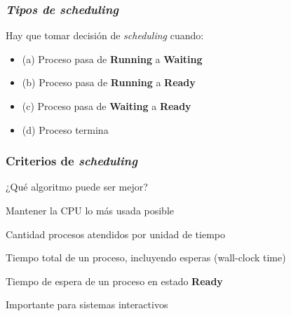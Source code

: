 \documentclass[letter]{beamer}
\begin{document}
\begin{frame}
  \frametitle{{\em Tipos de {\em scheduling}}}

  Hay que tomar decisión de {\em scheduling} cuando:
  \begin{itemize}
    \item<2->(a) Proceso pasa de {\bf Running} a {\bf Waiting}
    \item<2->(b) Proceso pasa de {\bf Running} a {\bf Ready}
    \item<2->(c) Proceso pasa de {\bf Waiting} a {\bf Ready}
    \item<2->(d) Proceso termina
  \end{itemize}
  

\end{frame}
\begin{frame}
  \frametitle{Criterios de {\em scheduling}}

  ¿Qué algoritmo puede ser mejor? 
  
  \begin{description}
     \item<3->[Uso de CPU] Mantener la CPU lo más usada posible
     \item<3->[Throughput] Cantidad procesos atendidos por unidad de tiempo
     \item<3->[Turnaround time] Tiempo total de un proceso, incluyendo esperas (wall-clock time)
     \item<3->[Waiting time] Tiempo de espera de un proceso en estado {\bf Ready}
     \item<3->[Response time] Importante para sistemas interactivos
  \end{description}
  
  

\end{frame}
\end{document}
